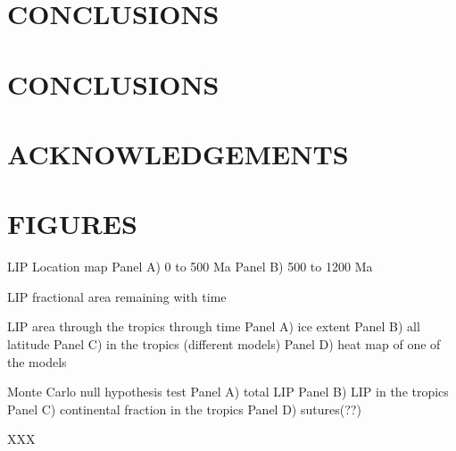 \documentclass[11pt,letterpaper]{article}
\begin{document}
\section*{CONCLUSIONS}

\section*{CONCLUSIONS}

\section*{ACKNOWLEDGEMENTS \label{sec:ACKNOWLEDGEMENTS}}


\section*{FIGURES}

LIP Location map
Panel A) 0 to 500 Ma
Panel B) 500 to 1200 Ma


LIP fractional area remaining with time

LIP area through the tropics through time
Panel A) ice extent
Panel B) all latitude 
Panel C) in the tropics (different models)
Panel D) heat map of one of the models

Monte Carlo null hypothesis test
Panel A) total LIP
Panel B) LIP in the tropics
Panel C) continental fraction in the tropics
Panel D) sutures(??)



\footnotesize

XXX

\singlespacing



\end{document}
